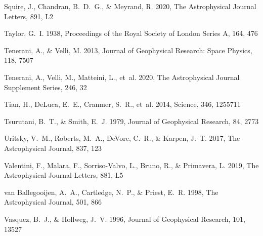 \documentclass[]{aastex62}
\begin{document}
\begin{thebibliography}{}
{Squire}, J., {Chandran}, B.~D.~G., \& {Meyrand}, R. 2020, The Astrophysical
  Journal Letters, 891, L2

{Taylor}, G.~I. 1938, Proceedings of the Royal Society of London Series A, 164,
  476

{Tenerani}, A., \& {Velli}, M. 2013, Journal of Geophysical Research: Space
  Physics, 118, 7507

{Tenerani}, A., {Velli}, M., {Matteini}, L., {et~al.} 2020, The Astrophysical
  Journal Supplement Series, 246, 32

{Tian}, H., {DeLuca}, E.~E., {Cranmer}, S.~R., {et~al.} 2014, Science, 346,
  1255711

{Tsurutani}, B.~T., \& {Smith}, E.~J. 1979, Journal of Geophysical Research,
  84, 2773

{Uritsky}, V.~M., {Roberts}, M.~A., {DeVore}, C.~R., \& {Karpen}, J.~T. 2017,
  The Astrophysical Journal, 837, 123

{Valentini}, F., {Malara}, F., {Sorriso-Valvo}, L., {Bruno}, R., \&
  {Primavera}, L. 2019, The Astrophysical Journal Letters, 881, L5

{van Ballegooijen}, A.~A., {Cartledge}, N.~P., \& {Priest}, E.~R. 1998, The
  Astrophysical Journal, 501, 866

{Vasquez}, B.~J., \& {Hollweg}, J.~V. 1996, Journal of Geophysical Research,
  101, 13527


\end{thebibliography}
\end{document}
